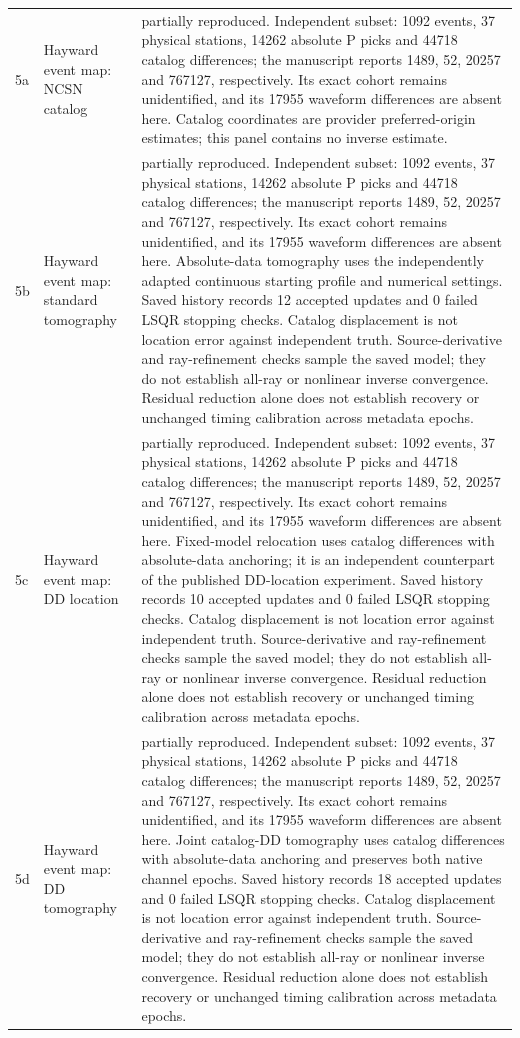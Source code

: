 \begin{longtable}{>{\raggedright\arraybackslash}p{}>{\raggedright\arraybackslash}p{}>{\raggedright\arraybackslash}p{}}
5a & Hayward event map: NCSN catalog & partially reproduced. Independent subset: 1092 events, 37 physical stations, 14262 absolute P picks and 44718 catalog differences; the manuscript reports 1489, 52, 20257 and 767127, respectively. Its exact cohort remains unidentified, and its 17955 waveform differences are absent here. Catalog coordinates are provider preferred-origin estimates; this panel contains no inverse estimate.\\
5b & Hayward event map: standard tomography & partially reproduced. Independent subset: 1092 events, 37 physical stations, 14262 absolute P picks and 44718 catalog differences; the manuscript reports 1489, 52, 20257 and 767127, respectively. Its exact cohort remains unidentified, and its 17955 waveform differences are absent here. Absolute-data tomography uses the independently adapted continuous starting profile and numerical settings. Saved history records 12 accepted updates and 0 failed LSQR stopping checks. Catalog displacement is not location error against independent truth. Source-derivative and ray-refinement checks sample the saved model; they do not establish all-ray or nonlinear inverse convergence. Residual reduction alone does not establish recovery or unchanged timing calibration across metadata epochs.\\
5c & Hayward event map: DD location & partially reproduced. Independent subset: 1092 events, 37 physical stations, 14262 absolute P picks and 44718 catalog differences; the manuscript reports 1489, 52, 20257 and 767127, respectively. Its exact cohort remains unidentified, and its 17955 waveform differences are absent here. Fixed-model relocation uses catalog differences with absolute-data anchoring; it is an independent counterpart of the published DD-location experiment. Saved history records 10 accepted updates and 0 failed LSQR stopping checks. Catalog displacement is not location error against independent truth. Source-derivative and ray-refinement checks sample the saved model; they do not establish all-ray or nonlinear inverse convergence. Residual reduction alone does not establish recovery or unchanged timing calibration across metadata epochs.\\
5d & Hayward event map: DD tomography & partially reproduced. Independent subset: 1092 events, 37 physical stations, 14262 absolute P picks and 44718 catalog differences; the manuscript reports 1489, 52, 20257 and 767127, respectively. Its exact cohort remains unidentified, and its 17955 waveform differences are absent here. Joint catalog-DD tomography uses catalog differences with absolute-data anchoring and preserves both native channel epochs. Saved history records 18 accepted updates and 0 failed LSQR stopping checks. Catalog displacement is not location error against independent truth. Source-derivative and ray-refinement checks sample the saved model; they do not establish all-ray or nonlinear inverse convergence. Residual reduction alone does not establish recovery or unchanged timing calibration across metadata epochs.\\

\end{longtable}
